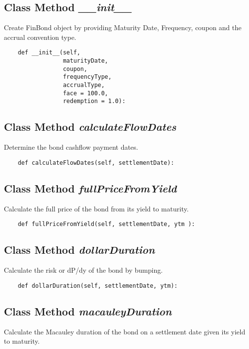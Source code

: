 \documentclass[twoside,11pt]{book}
\begin{document}
\subsection{Class Method {\it \_\_init\_\_}}
Create FinBond object by providing Maturity Date, Frequency, coupon and the accrual convention type. 

\begin{lstlisting}
    def __init__(self, 
                 maturityDate, 
                 coupon, 
                 frequencyType, 
                 accrualType,
                 face = 100.0,
                 redemption = 1.0):
\end{lstlisting}

\subsection{Class Method {\it calculateFlowDates}}
Determine the bond cashflow payment dates. 

\begin{lstlisting}
    def calculateFlowDates(self, settlementDate):
\end{lstlisting}

\subsection{Class Method {\it fullPriceFromYield}}
Calculate the full price of the bond from its yield to maturity. 

\begin{lstlisting}
    def fullPriceFromYield(self, settlementDate, ytm ):
\end{lstlisting}

\subsection{Class Method {\it dollarDuration}}
Calculate the risk or dP/dy of the bond by bumping. 

\begin{lstlisting}
    def dollarDuration(self, settlementDate, ytm):
\end{lstlisting}

\subsection{Class Method {\it macauleyDuration}}
Calculate the Macauley duration of the bond on a settlement date given its yield to maturity. 
\end{document}
